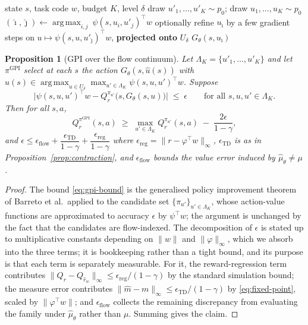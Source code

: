 \documentclass[11pt]{article}
\theoremstyle{plain}
\newtheorem{proposition}[lemma]{Proposition}
\theoremstyle{definition}
\theoremstyle{remark}
\newcommand{\1}{\mathbf 1}
\newcommand{\argmax}{\operatorname*{arg\,max}}
\newcommand{\Gth}{G_\theta}
\newcommand{\muhat}{\hat\mu_\theta}
\newcommand{\Udelta}{U_\delta}
\begin{document}
\begin{algorithm}[ht]
\caption{Rung 1: flow-GPI action selection}
\label{alg:gpi}
\begin{algorithmic}[1]
\Require state $s$, task code $w$, budget $K$, level $\delta$
\State draw $u'_1,\dots,u'_K\sim p_0$; draw $u_1,\dots,u_K\sim p_0$
       \Comment{each lies in $\Udelta$ w.p.\ $1-\delta$ (Cor.~\ref{cor:mass})}
\State $(\hat\imath,\hat\jmath)\gets\argmax_{i,j}\ \psi(s,u_i,u'_j)^\top w$
\State optionally refine $u_{\hat\imath}$ by a few gradient steps on
       $u\mapsto\psi(s,u,u'_{\hat\jmath})^\top w$, \textbf{projected onto} $\Udelta$
\State \Return $\Gth(s,u_{\hat\imath})$
\end{algorithmic}
\end{algorithm}

\begin{proposition}[GPI over the flow continuum]
\label{prop:gpi}
Let $\Lambda_K=\{u'_1,\dots,u'_K\}$ and let $\pi^{\mathrm{GPI}}$ select at each $s$ the
action $\Gth(s,\hat u(s))$ with
$\hat u(s)\in\argmax_{u\in\Udelta}\max_{u'\in\Lambda_K}\psi(s,u,u')^\top w$. Suppose
\[
  \big|\psi(s,u,u')^\top w-Q^{\pi_{u'}}_r\big(s,\Gth(s,u)\big)\big|\;\le\;\epsilon
  \qquad\text{for all }s,u,u'\in\Lambda_K .
\]
Then for all $s,a$,
\begin{equation}
\label{eq:gpi-bound}
  Q^{\pi^{\mathrm{GPI}}}_r(s,a)\;\ge\;\max_{u'\in\Lambda_K}Q^{\pi_{u'}}_r(s,a)
  \;-\;\frac{2\epsilon}{1-\gamma},
\end{equation}
and $\epsilon\le\epsilon_{\mathrm{flow}}+\dfrac{\epsilon_{\mathrm{TD}}}{1-\gamma}
+\dfrac{\epsilon_{\mathrm{reg}}}{1-\gamma}$ where $\epsilon_{\mathrm{reg}}=
\|r-\varphi^\top w\|_\infty$, $\epsilon_{\mathrm{TD}}$ is as in
Proposition~\ref{prop:contraction}, and $\epsilon_{\mathrm{flow}}$ bounds the value error
induced by $\muhat\ne\mu$.
\end{proposition}

\begin{proof}
The bound \eqref{eq:gpi-bound} is the generalised policy improvement theorem of Barreto et
al.\ applied to the candidate set $\{\pi_{u'}\}_{u'\in\Lambda_K}$, whose action-value
functions are approximated to accuracy $\epsilon$ by $\psi^\top w$; the argument is
unchanged by the fact that the candidates are flow-indexed. The decomposition of $\epsilon$
is stated up to multiplicative constants depending on $\|w\|$ and $\|\varphi\|_\infty$,
which we absorb into the three terms; it is bookkeeping rather than a tight bound, and its
purpose is that each term is separately measurable. For it, the
reward-regression term contributes $\|Q_r-Q_{\hat r_w}\|_\infty\le\epsilon_{\mathrm{reg}}
/(1-\gamma)$ by the standard simulation bound; the measure error contributes
$\|\hat m-m\|_\infty\le\epsilon_{\mathrm{TD}}/(1-\gamma)$ by \eqref{eq:fixed-point},
scaled by $\|\varphi^\top w\|$; and $\epsilon_{\mathrm{flow}}$ collects the remaining
discrepancy from evaluating the family under $\muhat$ rather than $\mu$. Summing gives the
claim.
\end{proof}
\end{document}
